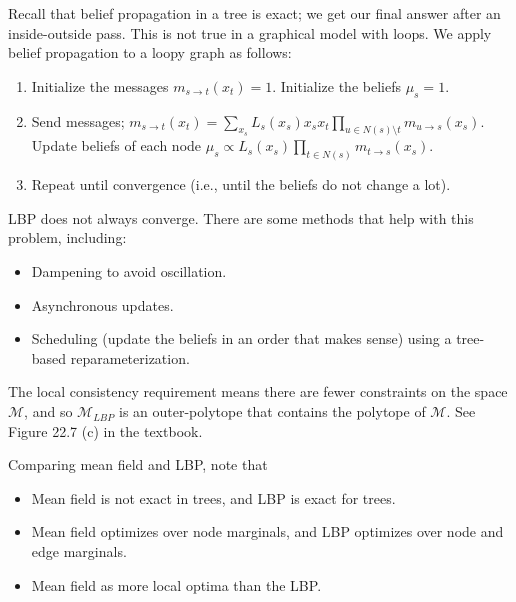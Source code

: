 \documentclass[twoside]{article}
\begin{document}
Recall that belief propagation in a tree is exact; we get our final answer after an inside-outside pass. This is not true in a graphical model with loops. We apply belief propagation to a loopy graph as follows:

\begin{enumerate}
\item Initialize the messages $m_{s \rightarrow t}(x_t) = 1$. Initialize the beliefs $\mu_s = 1$. 
\item Send messages; $m_{s\rightarrow t}(x_t) = \displaystyle \sum_{x_s} L_s(x_s) x_s x_t \prod_{u \in N(s) \setminus t}m_{u\rightarrow s}(x_s)$. Update beliefs of each node $\mu_s \propto L_s(x_s)\prod_{t \in N(s)}m_{t \rightarrow s}(x_s)$.
\item Repeat until convergence (i.e., until the beliefs do not change a lot). 
\end{enumerate}

LBP does not always converge. There are some methods that help with this problem, including:
\begin{itemize}
\item Dampening to avoid oscillation.
\item Asynchronous updates.
\item Scheduling (update the beliefs in an order that makes sense) using a tree-based reparameterization. 
\end{itemize}

The local consistency requirement means there are fewer constraints on the space $\mathcal{M}$, and so $\mathcal{M}_{LBP}$ is an outer-polytope that contains the polytope of $\mathcal{M}$. See Figure 22.7 (c) in the textbook. 

Comparing mean field and LBP, note that
\begin{itemize}
\item Mean field is not exact in trees, and LBP is exact for trees. 
\item Mean field optimizes over node marginals, and LBP optimizes over node and edge marginals.
\item Mean field as more local optima than the LBP. 
\end{itemize}
\end{document}

